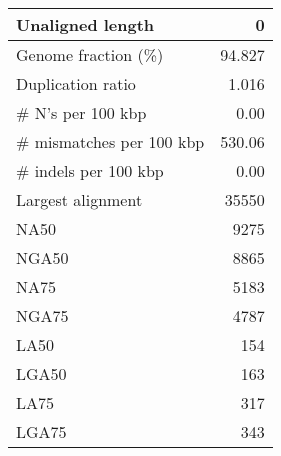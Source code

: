 \documentclass[12pt,a4paper]{article}
\begin{document}
\begin{table}[ht]
\begin{center}
\begin{tabular}{|l*{1}{|r}|}
Unaligned length & 0 \\ \hline
Genome fraction (\%) & 94.827 \\ \hline
Duplication ratio & 1.016 \\ \hline
\# N's per 100 kbp & 0.00 \\ \hline
\# mismatches per 100 kbp & 530.06 \\ \hline
\# indels per 100 kbp & 0.00 \\ \hline
Largest alignment & 35550 \\ \hline
NA50 & 9275 \\ \hline
NGA50 & 8865 \\ \hline
NA75 & 5183 \\ \hline
NGA75 & 4787 \\ \hline
LA50 & 154 \\ \hline
LGA50 & 163 \\ \hline
LA75 & 317 \\ \hline
LGA75 & 343 \\ \hline
\end{tabular}
\end{center}
\end{table}
\end{document}
